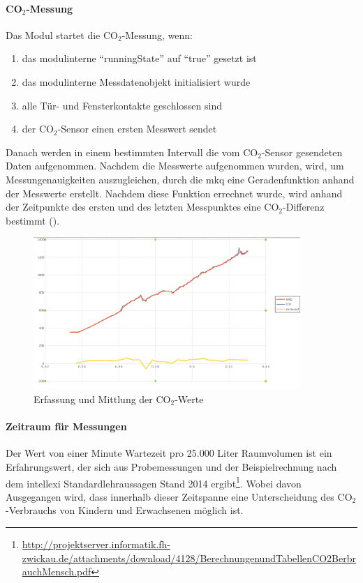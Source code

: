 \paragraph{CO$_2$-Messung} Das Modul startet die CO$_2$-Messung, wenn:

\begin{enumerate}
	\item das modulinterne "`runningState"' auf "`true"' gesetzt ist
	\item das modulinterne Messdatenobjekt initialisiert wurde
	\item alle Tür- und Fensterkontakte geschlossen sind
	\item der CO$_2$-Sensor einen ersten Messwert sendet
\end{enumerate}

Danach werden in einem bestimmten Intervall die vom CO$_2$-Sensor gesendeten Daten aufgenommen. Nachdem die Messwerte aufgenommen wurden, wird, um Messungenauigkeiten auszugleichen, durch die \gls{mkq} eine Geradenfunktion anhand der Messwerte erstellt. Nachdem diese Funktion errechnet wurde, wird anhand der Zeitpunkte des ersten und des letzten Messpunktes eine CO$_2$-Differenz bestimmt ().

\begin{figure}[h!]
	\centering
	\includegraphics[width=0.9\textwidth]{img/Modulkonzeption/PersonIdentificationChart.png}
	\caption{Erfassung und Mittlung der CO$_2$-Werte}
	\label{fig:personIdentificationChart}
\end{figure}

\paragraph{Zeitraum für Messungen}
Der Wert von einer Minute Wartezeit pro 25.000 Liter Raumvolumen ist ein Erfahrungswert, der sich aus Probemessungen und der Beispielrechnung nach dem intellexi Standardlehraussagen Stand 2014 ergibt\footnote{\url{http://projektserver.informatik.fh-zwickau.de/attachments/download/4128/BerechnungenundTabellenCO2BerbrauchMensch.pdf}}. Wobei davon Ausgegangen wird, dass innerhalb dieser Zeitspanne eine Unterscheidung des CO$_2$-Verbrauchs von Kindern und Erwachsenen möglich ist.

